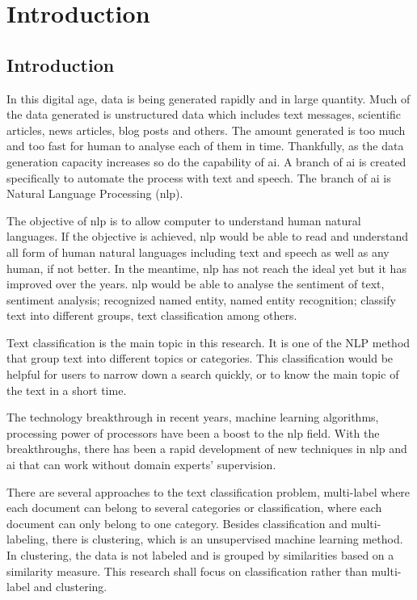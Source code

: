 \chapter{Introduction}
\section{Introduction}
In this digital age, data is being generated rapidly and in large quantity. Much of the data generated is unstructured data which includes text messages, scientific articles, news articles, blog posts and others. \cite{bigData} The amount generated is too much and too fast for human to analyse each of them in time. Thankfully, as the data generation capacity increases so do the capability of \ac{ai}. A branch of \ac{ai} is created specifically to automate the process with text and speech. The branch of \ac{ai} is Natural Language Processing (\ac{nlp}).

The objective of \ac{nlp} is to allow computer to understand human natural languages. If the objective is achieved, \ac{nlp} would be able to read and understand all form of human natural languages including text  and speech as well as any human, if not better. In the meantime, \ac{nlp} has not reach the ideal yet but it has improved over the years. \ac{nlp} would be able to analyse the sentiment of text, sentiment analysis; recognized named entity, named entity recognition; classify text into different groups, text classification among others.

Text classification is the main topic in this research. It is one of the NLP method that group text into different topics or categories. This classification would be helpful for users to narrow down a search quickly, or to know the main topic of the text in a short time.

The technology breakthrough in recent years, machine learning algorithms, processing power of processors have been a boost to the \ac{nlp} field. With the breakthroughs, there has been a rapid development of new techniques in \ac{nlp} and \ac{ai} that can work without domain experts' supervision.

There are several approaches to the text classification problem, multi-label where each document can belong to several categories or classification, where each document can only belong to one category. Besides classification and multi-labeling, there is clustering, which is an unsupervised machine learning method. In clustering, the data is not labeled and is grouped by similarities based on a similarity measure. This research shall focus on classification rather than multi-label and clustering.

